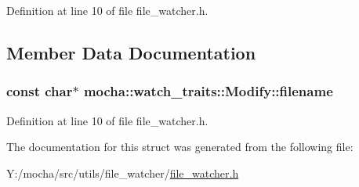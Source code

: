 Definition at line 10 of file file\_\-watcher.h.



\subsection{Member Data Documentation}
\hypertarget{structmocha_1_1watch__traits_1_1_modify_a1adcfe95a0d1302299c49423c424eb7a}{
\subsubsection[{filename}]{\setlength{\rightskip}{0pt plus 5cm}const char$\ast$ {\bf mocha::watch\_\-traits::Modify::filename}}}
\label{structmocha_1_1watch__traits_1_1_modify_a1adcfe95a0d1302299c49423c424eb7a}


Definition at line 10 of file file\_\-watcher.h.



The documentation for this struct was generated from the following file:\begin{DoxyCompactItemize}
\item 
Y:/mocha/src/utils/file\_\-watcher/\hyperlink{file__watcher_8h}{file\_\-watcher.h}\end{DoxyCompactItemize}
